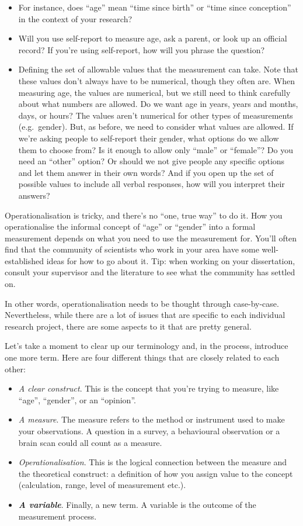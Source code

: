 \documentclass[
  11pt,
  a4paper,
  twoside,symmetric,openright]{book}
\providecommand{\tightlist}{%
  \setlength{\itemsep}{0pt}\setlength{\parskip}{0pt}}
\theoremstyle{break}
\theoremstyle{break}
\begin{document}
\begin{itemize}
\tightlist
\item
  For instance, does ``age'' mean ``time since birth'' or ``time since conception'' in the context of your research?
\item
  Will you use self-report to measure age, ask a parent, or look up an official record? If you're using self-report, how will you phrase the question?
\item
  Defining the set of allowable values that the measurement can take. Note that these values don't always have to be numerical, though they often are. When measuring age, the values are numerical, but we still need to think carefully about what numbers are allowed. Do we want age in years, years and months, days, or hours? The values aren't numerical for other types of measurements (e.g.~gender). But, as before, we need to consider what values are allowed. If we're asking people to self-report their gender, what options do we allow them to choose from? Is it enough to allow only ``male'' or ``female''? Do you need an ``other'' option? Or should we not give people any specific options and let them answer in their own words? And if you open up the set of possible values to include all verbal responses, how will you interpret their answers?
\end{itemize}

Operationalisation is tricky, and there's no ``one, true way'' to do it. How you operationalise the informal concept of ``age'' or ``gender'' into a formal measurement depends on what you need to use the measurement for. You'll often find that the community of scientists who work in your area have some well-established ideas for how to go about it. Tip: when working on your dissertation, consult your supervisor and the literature to see what the community has settled on.

In other words, operationalisation needs to be thought through case-by-case. Nevertheless, while there are a lot of issues that are specific to each individual research project, there are some aspects to it that are pretty general.

Let's take a moment to clear up our terminology and, in the process, introduce one more term. Here are four different things that are closely related to each other:

\begin{itemize}
\tightlist
\item
  \emph{A clear construct}. This is the concept that you're trying to measure, like ``age'', ``gender'', or an ``opinion''.
\item
  \emph{A measure}. The measure refers to the method or instrument used to make your observations. A question in a survey, a behavioural observation or a brain scan could all count as a measure.
\item
  \emph{Operationalisation}. This is the logical connection between the measure and the theoretical construct: a definition of how you assign value to the concept (calculation, range, level of measurement etc.).
\item
  \textbf{\emph{A variable}}. Finally, a new term. A variable is the outcome of the measurement process.
\end{itemize}
\end{document}
